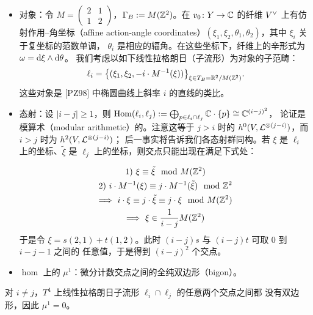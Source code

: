 \begin{itemize}[leftmargin=2.2em,itemsep=0.25em]
\item 对象：令 $M=\begin{pmatrix}2&1\\1&2\end{pmatrix}$，$\Gamma_B:=M(\mathbb{Z}^2)$。在
  $v_0\colon Y\to\mathbb{C}$ 的纤维 $V^{\vee}$ 上有仿射作用--角坐标（affine action-angle
  coordinates）$(\xi_1,\xi_2,\theta_1,\theta_2)$，其中 $\xi_i$ 关于复坐标的范数单调，
  $\theta_i$ 是相应的辐角。在这些坐标下，纤维上的辛形式为 $\omega=\mathrm{d}\xi\wedge\mathrm{d}\theta$。
  我们考虑以如下线性拉格朗日（子流形）为对象的子范畴：
\[
\ell_i=\bigl\{(\xi_1,\xi_2,-i\cdot M^{-1}(\xi))\bigr\}_{\xi\in T_B=\mathbb{R}^2/M(\mathbb{Z}^2)}.
\]
  这些对象是 [PZ98] 中椭圆曲线上斜率 $i$ 的直线的类比。
\item 态射：设 $|i-j|\ge1$，则
  $\operatorname{Hom}(\ell_i,\ell_j):=\bigoplus_{p\in\ell_i\cap\ell_j}\mathbb{C}\cdot\{p\}\cong\mathbb{C}^{(i-j)^2}$，
  论证是模算术（modular arithmetic）的。注意这等于 $j>i$ 时的
  $h^0(V,\mathcal{L}^{\otimes(j-i)})$，而 $i>j$ 时为 $h^2(V,\mathcal{L}^{\otimes(j-i)})$；
  后一事实将告诉我们各态射群同构。若 $\xi$ 是 $\ell_i$ 上的坐标、$\tilde\xi$ 是
  $\ell_j$ 上的坐标，则交点只能出现在满足下式处：

\begin{equation}\label{eq:3-1}
\begin{gathered}
1)\ \xi\equiv\tilde\xi\mod M(\mathbb{Z}^2)\\
2)\ i\cdot M^{-1}(\xi)\equiv j\cdot M^{-1}(\tilde\xi)\mod{\mathbb{Z}}^2\\
\Longrightarrow\ i\cdot\xi\equiv j\cdot\tilde\xi\equiv j\cdot\xi\mod M(\mathbb{Z}^2)\\
\Longrightarrow\ \xi\in\frac{1}{i-j}M(\mathbb{Z}^2)
\end{gathered}
\end{equation}
  于是令 $\xi=s(2,1)+t(1,2)$。此时 $(i-j)s$ 与 $(i-j)t$ 可取 $0$ 到 $i-j-1$ 之间的
  任意值，于是得到 $(i-j)^2$ 个交点。
\item $\hom$ 上的 $\mu^1$：微分计数交点之间的全纯双边形（bigon）。
\end{itemize}


\begin{claim}\label{claim:no-bigons}
对 $i\ne j$，$T^4$ 上线性拉格朗日子流形 $\ell_i\cap\ell_j$ 的任意两个交点之间都
没有双边形，因此 $\mu^1=0$。
\end{claim}

